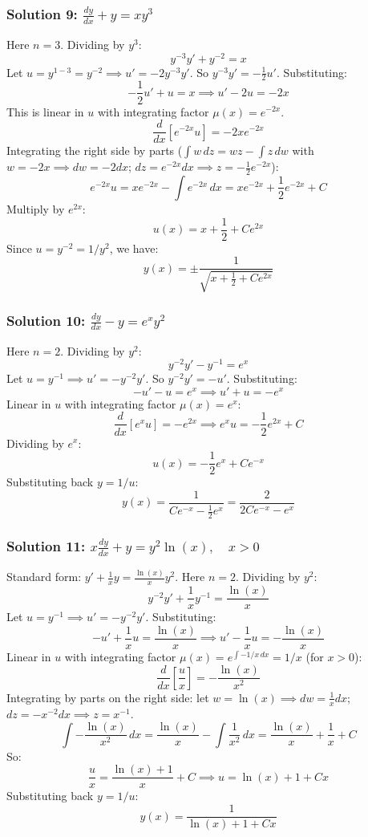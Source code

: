 \documentclass[11pt,letterpaper]{article}
\begin{document}
\subsubsection*{Solution 9: $\frac{dy}{dx} + y = xy^3$}
Here $n = 3$. Dividing by $y^3$:
\[ y^{-3} y' + y^{-2} = x \]
Let $u = y^{1-3} = y^{-2} \implies u' = -2 y^{-3} y'$. So $y^{-3} y' = -\frac{1}{2}u'$.
Substituting:
\[ -\frac{1}{2}u' + u = x \implies u' - 2u = -2x \]
This is linear in $u$ with integrating factor $\mu(x) = e^{-2x}$.
\[ \frac{d}{dx}[e^{-2x}u] = -2xe^{-2x} \]
Integrating the right side by parts ($\int w \, dz = wz - \int z \, dw$ with $w = -2x \implies dw = -2dx$; $dz = e^{-2x}dx \implies z = -\frac{1}{2}e^{-2x}$):
\[ e^{-2x}u = x e^{-2x} - \int e^{-2x} \, dx = x e^{-2x} + \frac{1}{2}e^{-2x} + C \]
Multiply by $e^{2x}$:
\[ u(x) = x + \frac{1}{2} + C e^{2x} \]
Since $u = y^{-2} = 1/y^2$, we have:
\[ y(x) = \pm \frac{1}{\sqrt{x + \frac{1}{2} + C e^{2x}}} \]

\subsubsection*{Solution 10: $\frac{dy}{dx} - y = e^x y^2$}
Here $n = 2$. Dividing by $y^2$:
\[ y^{-2}y' - y^{-1} = e^x \]
Let $u = y^{-1} \implies u' = -y^{-2}y'$. So $y^{-2}y' = -u'$.
Substituting:
\[ -u' - u = e^x \implies u' + u = -e^x \]
Linear in $u$ with integrating factor $\mu(x) = e^x$:
\[ \frac{d}{dx}[e^x u] = -e^{2x} \implies e^x u = -\frac{1}{2}e^{2x} + C \]
Dividing by $e^x$:
\[ u(x) = -\frac{1}{2}e^x + C e^{-x} \]
Substituting back $y = 1/u$:
\[ y(x) = \frac{1}{Ce^{-x} - \frac{1}{2}e^x} = \frac{2}{2Ce^{-x} - e^x} \]

\subsubsection*{Solution 11: $x\frac{dy}{dx} + y = y^2 \ln(x), \quad x > 0$}
Standard form: $y' + \frac{1}{x}y = \frac{\ln(x)}{x}y^2$. Here $n=2$. Dividing by $y^2$:
\[ y^{-2}y' + \frac{1}{x}y^{-1} = \frac{\ln(x)}{x} \]
Let $u = y^{-1} \implies u' = -y^{-2}y'$. Substituting:
\[ -u' + \frac{1}{x}u = \frac{\ln(x)}{x} \implies u' - \frac{1}{x}u = -\frac{\ln(x)}{x} \]
Linear in $u$ with integrating factor $\mu(x) = e^{\int -1/x \, dx} = 1/x$ (for $x > 0$):
\[ \frac{d}{dx}\left[ \frac{u}{x} \right] = -\frac{\ln(x)}{x^2} \]
Integrating by parts on the right side: let $w = \ln(x) \implies dw = \frac{1}{x}dx$; $dz = -x^{-2}dx \implies z = x^{-1}$.
\[ \int -\frac{\ln(x)}{x^2} \, dx = \frac{\ln(x)}{x} - \int \frac{1}{x^2} \, dx = \frac{\ln(x)}{x} + \frac{1}{x} + C \]
So:
\[ \frac{u}{x} = \frac{\ln(x) + 1}{x} + C \implies u = \ln(x) + 1 + Cx \]
Substituting back $y = 1/u$:
\[ y(x) = \frac{1}{\ln(x) + 1 + Cx} \]
\end{document}
